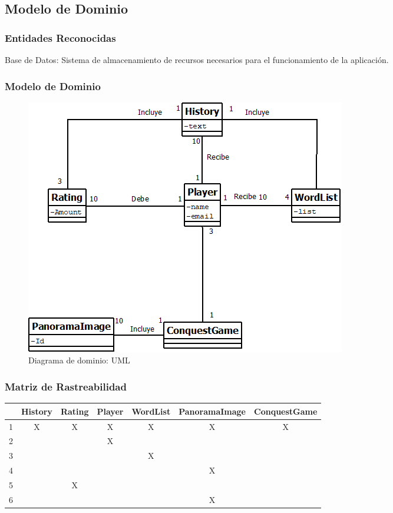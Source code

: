 \subsection{Modelo de Dominio}
\subsubsection{Entidades Reconocidas}
Base de Datos: Sistema de almacenamiento de recursos necesarios para el funcionamiento de la aplicación.
\subsubsection{Modelo de Dominio}
\begin{figure}[H]
\centering
   \includegraphics[scale=0.5]{imgs/ModeloDominio.png}
   \begin{center}
   \caption{Diagrama de dominio: UML}
   \end{center}
\end{figure}
\subsubsection{Matriz de Rastreabilidad}
\begin{table}[H]
    \begin{center}
        \begin{tabular}{| c | c | c | c | c | c | c |}       
        	\hline 
        	 & History & Rating & Player & WordList & PanoramaImage & ConquestGame \\
        	\hline
        	1 & X & X & X & X & X & X \\
        	\hline
        	2 &  & & X &  &  &  \\
        	\hline
        	3 &  &  &  & X &  &  \\
        	\hline
        	4 &  &  &  &  & X &  \\
        	\hline
        	5 &  & X &  &  &  &  \\
        	\hline
        	6 &  &  &  &  & X &  \\
        	\hline
        \end{tabular}
    \end{center}
\end{table}